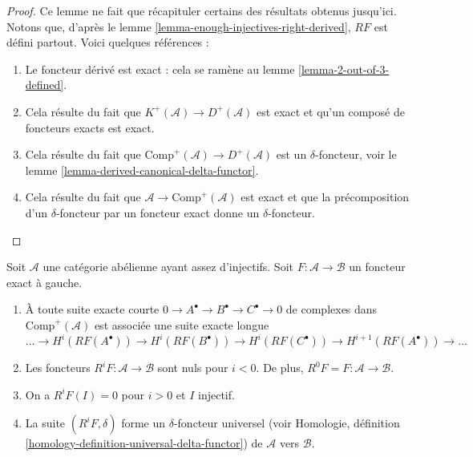 \begin{proof}
Ce lemme ne fait que récapituler certains des résultats obtenus jusqu'ici.
Notons que, d'après le lemme
\ref{lemma-enough-injectives-right-derived}, $RF$ est défini partout. Voici
quelques références :
\begin{enumerate}
\item Le foncteur dérivé est exact : cela se ramène au
lemme \ref{lemma-2-out-of-3-defined}.
\item Cela résulte du fait que
$K^{+}(\mathcal{A}) \to D^{+}(\mathcal{A})$ est exact et qu'un composé de
foncteurs exacts est exact.
\item Cela résulte du fait que
$\text{Comp}^{+}(\mathcal{A}) \to D^{+}(\mathcal{A})$ est un
$\delta$-foncteur, voir le
lemme \ref{lemma-derived-canonical-delta-functor}.
\item Cela résulte du fait que
$\mathcal{A} \to \text{Comp}^{+}(\mathcal{A})$ est exact et que la
précomposition d'un $\delta$-foncteur par un foncteur exact donne un
$\delta$-foncteur.
\end{enumerate}
\end{proof}

\begin{lemma}
\label{lemma-higher-derived-functors}
Soit $\mathcal{A}$ une catégorie abélienne ayant assez d'injectifs.
Soit $F : \mathcal{A} \to \mathcal{B}$ un foncteur exact à gauche.
\begin{enumerate}
\item À toute suite exacte courte
$0 \to A^\bullet \to B^\bullet \to C^\bullet \to 0$ de complexes dans
$\text{Comp}^{+}(\mathcal{A})$ est associée une suite exacte longue
$$
\ldots \to
H^i(RF(A^\bullet)) \to
H^i(RF(B^\bullet)) \to
H^i(RF(C^\bullet)) \to
H^{i + 1}(RF(A^\bullet)) \to \ldots
$$
\item Les foncteurs $R^iF : \mathcal{A} \to \mathcal{B}$ sont nuls pour
$i < 0$. De plus, $R^0F = F : \mathcal{A} \to \mathcal{B}$.
\item On a $R^iF(I) = 0$ pour $i > 0$ et $I$ injectif.
\item La suite $(R^iF, \delta)$ forme un $\delta$-foncteur universel (voir
Homologie, définition \ref{homology-definition-universal-delta-functor}) de
$\mathcal{A}$ vers $\mathcal{B}$.
\end{enumerate}
\end{lemma}


